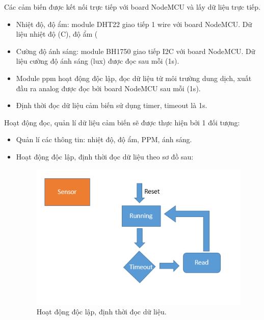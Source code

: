 \documentclass[a4paper,12pt,oneside]{article}
\begin{document}
\noindent Các cảm biến được kết nối trực tiếp với board NodeMCU và lấy dữ liệu trực tiếp.
\begin{itemize}
	\item Nhiệt độ, độ ẩm: module DHT22 giao tiếp 1 wire với board NodeMCU. Dữ liệu nhiệt độ (C), độ ẩm (%
	\item Cường độ ánh sáng: module BH1750 giao tiếp I2C với board NodeMCU. Dữ liệu cường độ ánh sáng (lux) được đọc sau mỗi (1s).
	\item Module ppm hoạt động độc lập, đọc dữ liệu từ môi trường dung dịch, xuất đầu ra analog được đọc bởi board NodeMCU sau mỗi (1s).
	\item Định thời đọc dữ liệu cảm biến sử dụng timer, timeout là 1s.
\end{itemize}
\noindent Hoạt động đọc, quản lí dữ liệu cảm biến sẽ được thực hiện bởi 1 đối tượng:
\begin{itemize}
\item Quản lí các thông tin: nhiệt độ, độ ẩm, PPM, ánh sáng.
\item Hoạt động độc lập, định thời đọc dữ liệu theo sơ đồ sau:
\begin{center}
\begin{figure}[h!]
\begin{center}
\includegraphics[scale=1]{hinh/sensor.PNG}
\end{center}
\caption{Hoạt động độc lập, định thời đọc dữ liệu.}
\end{figure}
\end{center}
\end{itemize}
\end{document}
